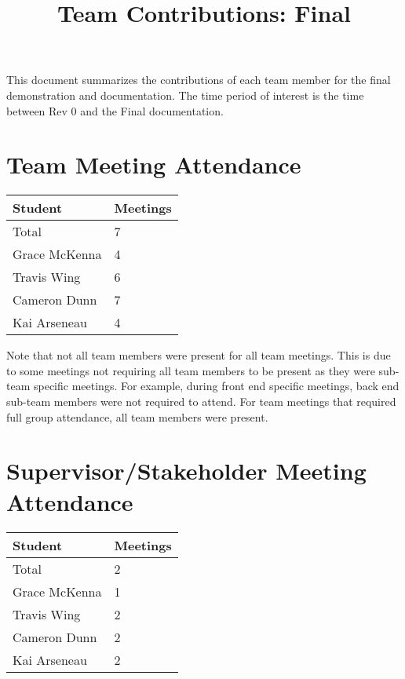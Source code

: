 \documentclass{article}
\title{Team Contributions: Final\\\progname}
\author{\authname}
\date{}
\begin{document}
\maketitle

This document summarizes the contributions of each team member for the final
demonstration and documentation.  The time period of interest is the time
between Rev 0 and the Final documentation.

\section{Team Meeting Attendance}

\begin{table}[H]
\centering
\begin{tabular}{ll}
\toprule
\textbf{Student} & \textbf{Meetings}\\
\midrule
Total & 7\\
Grace McKenna & 4\\
Travis Wing & 6\\
Cameron Dunn & 7\\
Kai Arseneau & 4\\
\bottomrule
\end{tabular}
\end{table}

Note that not all team members were present for all team meetings. This is due to some meetings not requiring all team members to be present as they were sub-team specific meetings.
For example, during front end specific meetings, back end sub-team members were not required to attend. For team meetings that required full group attendance, all team members were present.

\section{Supervisor/Stakeholder Meeting Attendance}

\begin{table}[H]
\centering
\begin{tabular}{ll}
\toprule
\textbf{Student} & \textbf{Meetings}\\
\midrule
Total & 2 \\
Grace McKenna & 1\\
Travis Wing & 2\\
Cameron Dunn & 2\\
Kai Arseneau & 2\\
\bottomrule
\end{tabular}
\end{table}
\end{document}
